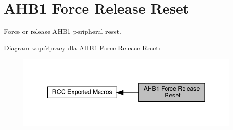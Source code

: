 \hypertarget{group___r_c_c___a_h_b1___force___release___reset}{}\section{A\+H\+B1 Force Release Reset}
\label{group___r_c_c___a_h_b1___force___release___reset}


Force or release A\+H\+B1 peripheral reset.  


Diagram współpracy dla A\+H\+B1 Force Release Reset\+:\nopagebreak
\begin{figure}[H]
\begin{center}
\leavevmode
\includegraphics[width=342pt]{group___r_c_c___a_h_b1___force___release___reset}
\end{center}
\end{figure}
